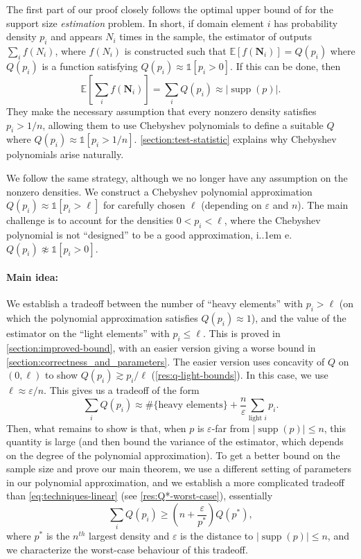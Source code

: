 \documentclass{theoretics}
\newcommand*\ie{i.\kern.1em e.\ }
\DeclareMathOperator{\supp}{supp}   %
\newcommand{\Ex}[1]{\bE \left[ #1 \right]}
\newcommand{\ind}[1]{\mathds{1} \left[ #1 \right] }
\newcommand{\bE}{\ensuremath{\mathbb{E}}}
\renewcommand{\epsilon}{\varepsilon}
\begin{document}
The first part of our proof closely follows the optimal upper bound of \cite{WY19} for the support
size \emph{estimation} problem. In short, if domain element $i$ has probability density $p_i$ and
appears $N_i$ times in the sample, the estimator of \cite{WY19} outputs $\sum_i f(N_i)$, where
$f(N_i)$ is constructed such that $\Ex{f(\bm N_i)} = Q(p_i)$ where $Q(p_i)$ is a function satisfying
$Q(p_i) \approx \ind{p_i > 0}$. If this can be done, then
\[
    \Ex{ \sum_i f(\bm N_i) } = \sum_i Q(p_i) \approx |\supp(p)| .
\]
They make the necessary assumption that every nonzero density satisfies $p_i > 1/n$, allowing them
to use Chebyshev polynomials to define a suitable $Q$ where $Q(p_i) \approx \ind{p_i > 1/n}$. 
\cref{section:test-statistic} explains why Chebyshev polynomials arise naturally.

We follow the same strategy, although we no longer have any assumption on the nonzero densities.  We
construct a Chebyshev polynomial approximation $Q(p_i) \approx \ind{p_i > \ell}$ for carefully
chosen $\ell$ (depending on $\epsilon$ and $n$). The main challenge is to account for the densities
$0 < p_i < \ell$, where the Chebyshev polynomial is not ``designed'' to be a good approximation, \ie
$Q(p_i) \not\approx \ind{p_i > 0}$.

\paragraph*{Main idea:} We establish a tradeoff between the number of ``heavy elements'' with $p_i >
\ell$ (on which the polynomial approximation satisfies $Q(p_i) \approx 1$), and the value of the
estimator on the ``light elements'' with $p_i \leq \ell$. This is proved in
\cref{section:improved-bound}, with an easier version giving a worse bound in
\cref{section:correctness_and_parameters}. The easier version uses concavity of $Q$ on $(0, \ell)$
to show $Q(p_i) \gtrsim p_i/\ell$ (\cref{res:q-light-bounds}).  In this case, we use $\ell \approx
\epsilon/n$.  This gives us a tradeoff of the form
\begin{equation}
\label{eq:techniques-linear}
    \sum_i Q(p_i) \approx  \#\{\text{heavy elements}\} + \frac{n}{\epsilon} \sum_{\text{light }
i} p_i .
\end{equation}
Then, what remains to show is that, when $p$ is $\epsilon$-far from $|\supp(p)| \leq n$, this
quantity is large (and then bound the variance of the estimator, which depends on the degree of the
polynomial approximation). To get a better bound on the sample size and prove our main theorem, we
use a different setting of parameters in our polynomial approximation, and we establish a more
complicated tradeoff than \cref{eq:techniques-linear} (see \cref{res:Q*-worst-case}), essentially
\begin{equation}
    \sum_i Q(p_i) \geq \left(n + \frac{\epsilon}{p^*}\right) Q(p^*),
\end{equation}
where $p^*$ is the $n^{th}$ largest density and $\epsilon$ is the distance to $|\supp(p)|\leq n$,
and we characterize the worst-case behaviour of this tradeoff. 
\end{document}
